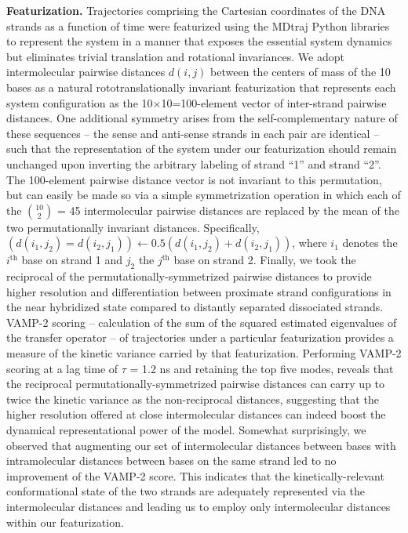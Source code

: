 \documentclass[journal=jpcbfk,manuscript=article]{achemso}
\begin{document}
\textbf{Featurization.} Trajectories comprising the Cartesian coordinates of the DNA strands as a function of time were featurized using the MDtraj Python libraries \citep{McGibbon2015MDTraj:Trajectories} to represent the system in a manner that exposes the essential system dynamics but eliminates trivial translation and rotational invariances. We adopt intermolecular pairwise distances $d(i,j)$ between the centers of mass of the 10 bases as a natural rototranslationally invariant featurization that represents each system configuration as the 10$\times$10=100-element vector of inter-strand pairwise distances. One additional symmetry arises from the self-complementary nature of these sequences -- the sense and anti-sense strands in each pair are identical -- such that the representation of the system under our featurization should remain unchanged upon inverting the arbitrary labeling of strand ``1'' and strand ``2''.\citep{Sengupta2019AutomatedSelf-assembly} The 100-element pairwise distance vector is not invariant to this permutation, but can easily be made so via a simple symmetrization operation in which each of the $10 \choose 2$ =  45 intermolecular pairwise distances are replaced by the mean of the two permutationally invariant distances. Specifically, $\left( d(i_1,j_2) = d(i_2,j_1) \right) \leftarrow 0.5\left( d(i_1,j_2) + d(i_2,j_1) \right)$, where $i_1$ denotes the $i^\mathrm{th}$ base on strand 1 and $j_2$ the $j^\mathrm{th}$ base on strand 2. \citep{Sengupta2019AutomatedSelf-assembly} Finally, we took the reciprocal of the permutationally-symmetrized pairwise distances to provide higher resolution and differentiation between proximate strand configurations in the near hybridized state compared to distantly separated dissociated strands. VAMP-2 scoring -- calculation of the sum of the squared estimated eigenvalues of the transfer operator -- of trajectories under a particular featurization provides a measure of the kinetic variance carried by that featurization. \citep{Noe2013ASystems, Noe2015KineticSimulation, Scherer2019VariationalKinetics, Wu2020VariationalData} Performing VAMP-2 scoring at a lag time of $\tau$ = 1.2 ns and retaining the top five modes, reveals that the reciprocal permutationally-symmetrized pairwise distances can carry up to twice the kinetic variance as the non-reciprocal distances, suggesting that the higher resolution offered at close intermolecular distances can indeed boost the dynamical representational power of the model. Somewhat surprisingly, we observed that augmenting our set of intermolecular distances between bases with intramolecular distances between bases on the same strand led to no improvement of the VAMP-2 score. This indicates that the kinetically-relevant conformational state of the two strands are adequately represented via the intermolecular distances and leading us to employ only intermolecular distances within our featurization.
\end{document}
